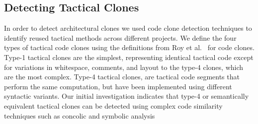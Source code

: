 


\subsection{Detecting Tactical Clones}
In order to detect architectural clones we used code clone detection techniques to identify reused tactical methods across different projects.
We define the four types of tactical code clones using the definitions from Roy et al.~\cite{Roy:2008:NAD:1437898.1438600} for code clones.
Type-1 tactical clones are the simplest, representing identical tactical code except for variations in whitespace, comments, and layout to the type-4 clones, which are the most complex. Type-4 tactical clones, are tactical code segments that perform the same computation, but have been implemented using different syntactic variants. Our initial investigation indicates that type-4 or semantically equivalent tactical clones can be detected using complex code similarity techniques such as concolic and symbolic analysis \cite{wcre2013}





